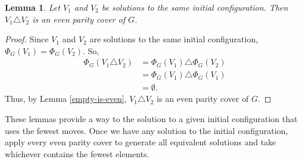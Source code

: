 \documentclass[a4paper]{article}
\newtheorem{lemma}{Lemma}
\begin{document}
	\begin{lemma}
		Let $V_1$ and $V_2$ be solutions to the same initial configuration.
		Then $V_1 \triangle V_2$ is an even parity cover of $G$.
	\end{lemma}
	\begin{proof}
		Since $V_1$ and $V_2$ are solutions to the same initial configuration, $\Phi_G(V_1) = \Phi_G(V_2)$.
		So,
		\begin{align*}
			\Phi_G(V_1 \triangle V_2) &= \Phi_G(V_1) \triangle \Phi_G(V_2) \\
			&= \Phi_G(V_1) \triangle \Phi_G(V_1) \\
			&= \emptyset.
		\end{align*}
		Thus, by Lemma \ref{empty-is-even}, $V_1 \triangle V_2$ is an even parity cover of $G$.
	\end{proof}

	These lemmas provide a way to the solution to a given initial configuration that uses the fewest moves.
	Once we have any solution to the initial configuration, apply every even parity cover to generate all equivalent solutions and take whichever contains the fewest elements.
		
\end{document}
